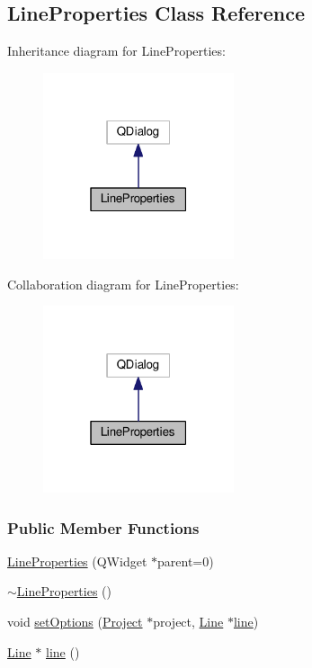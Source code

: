 \hypertarget{class_line_properties}{}\subsection{Line\+Properties Class Reference}
\label{class_line_properties}


Inheritance diagram for Line\+Properties\+:\nopagebreak
\begin{figure}[H]
\begin{center}
\leavevmode
\includegraphics[width=159pt]{class_line_properties__inherit__graph}
\end{center}
\end{figure}


Collaboration diagram for Line\+Properties\+:\nopagebreak
\begin{figure}[H]
\begin{center}
\leavevmode
\includegraphics[width=159pt]{class_line_properties__coll__graph}
\end{center}
\end{figure}
\subsubsection*{Public Member Functions}
\begin{DoxyCompactItemize}
\item 
\hyperlink{class_line_properties_a0bc0d7c02db0a4ea920d040f76679fec}{Line\+Properties} (Q\+Widget $\ast$parent=0)
\item 
\hyperlink{class_line_properties_a59017a6580f2e02dc492522d9267de29}{$\sim$\+Line\+Properties} ()
\item 
void \hyperlink{class_line_properties_ad434fc8e65787648a44737fb9f46b475}{set\+Options} (\hyperlink{class_project}{Project} $\ast$project, \hyperlink{class_line}{Line} $\ast$\hyperlink{class_line_properties_ae99691d680b4df7bac3419b5588bd777}{line})
\item 
\hyperlink{class_line}{Line} $\ast$ \hyperlink{class_line_properties_ae99691d680b4df7bac3419b5588bd777}{line} ()
\end{DoxyCompactItemize}


